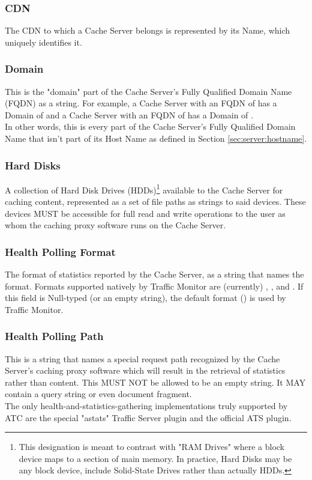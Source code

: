 \subsubsection{CDN}
The CDN to which a Cache Server belongs is represented by its Name, which
uniquely identifies it.

\subsubsection{Domain\label{sec:server:domain}}
This is the "domain" part of the Cache Server's Fully Qualified Domain Name
(FQDN) as a string. For example, a Cache Server with an FQDN of
 has a Domain of  and a Cache Server with an FQDN of
 has a Domain of .\\
In other words, this is every part of the Cache Server's Fully Qualified Domain
Name that isn't part of its Host Name as defined in Section
\ref{sec:server:hostname}.

\subsubsection{Hard Disks}
A collection of Hard Disk Drives (HDDs)\footnote{This designation is meant to
contrast with "RAM Drives" where a block device maps to a section of main
memory. In practice, Hard Disks may be any block device, include Solid-State
Drives rather than actually HDDs.} available to the Cache Server for caching
content, represented as a set of file paths as strings to said devices. These
devices MUST be accessible for full read and write operations to the user as
whom the caching proxy software runs on the Cache Server.

\subsubsection{Health Polling Format}
The format of statistics reported by the Cache Server, as a string that names
the format. Formats supported natively by Traffic Monitor are (currently)
, , and . If this
field is Null-typed (or an empty string), the default format
() is used by Traffic Monitor.

\subsubsection{Health Polling Path}
This is a string that names a special request path recognized by the Cache
Server's caching proxy software which will result in the retrieval of statistics
rather than content. This MUST NOT be allowed to be an empty string. It MAY
contain a query string or even document fragment.\\
The only health-and-statistics-gathering implementations truly supported by ATC
are the special "astats" Traffic Server plugin and the official ATS
 plugin.

